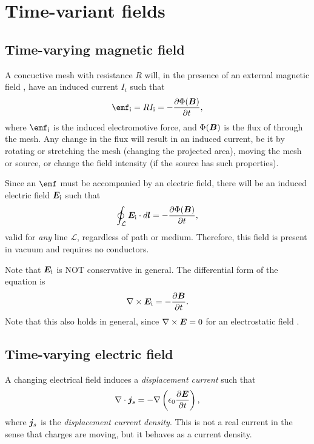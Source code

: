      
\section{Time-variant fields}
\subsection{Time-varying magnetic field}
    A concuctive mesh with resistance $R$ will, in the presence of an external magnetic field \B, 
    have an induced current $I_i$ such that
    \begin{equation}
        \emf_\text{i} = RI_\text{i} = -\frac{\partial \Phi(\B)}{\partial t},
    \end{equation}
    where $\emf_\text{i}$ is the induced electromotive force, and $\Phi(\bm{B})$ is the flux of \B{} through the mesh. 
    Any change in the flux will result in an induced current, 
    be it by rotating or stretching the mesh (changing the projected area),
    moving the mesh or source, or change the field intensity (if the source has such properties).

    Since an $\emf$ must be accompanied by an electric field, 
    there will be an induced electric field $\bm{E}_\text{i}$ such that
    \begin{equation}
        \oint_\mathcal{L}\bm{E}_\text{i}\cdot d\bm{l} = -\frac{\partial \Phi(\bm{B})}{\partial t},
    \end{equation}
    valid for \textit{any} line $\mathcal{L}$, regardless of path or medium. 
    Therefore, this field is present in vacuum and requires no conductors.

    Note that $\bm{E}_\text{i}$ is NOT conservative in general. The differential form of the equation is
    \begin{equation}
        \nabla \times \bm{E}_\text{i} = -\frac{\partial \bm{B}}{\partial t}.
    \end{equation}
    Note that this also holds in general, since $\nabla\times\bm{E} = 0$ for an electrostatic field \E.

\subsection{Time-varying electric field} \label{Time-varying electric field}
    A changing electrical field induces a \textit{displacement current} such that
    \begin{equation}
        \nabla \cdot \bm{j}_s = -\nabla\left(\epsilon_0\frac{\partial\bm{E}}{\partial t}\right),
    \end{equation}
    where $\bm{j}_s$ is the \textit{displacement current density}. This is not a real current in the sense that charges are moving, 
    but it behaves as a current density.

